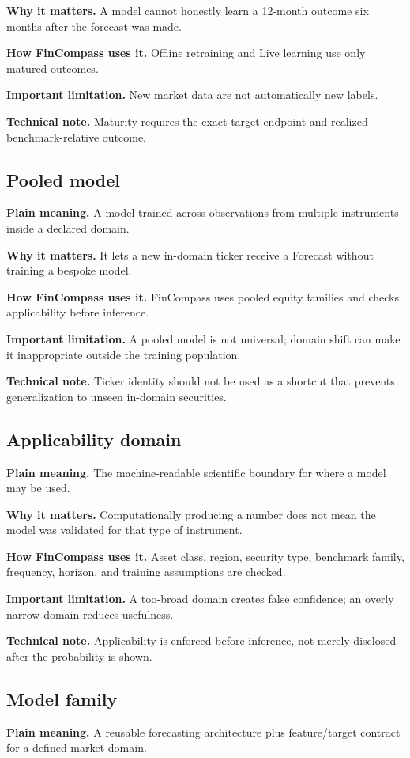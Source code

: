 \documentclass[11pt]{article}
\begin{document}
\textbf{Why it matters.} A model cannot honestly learn a 12-month outcome six months after the forecast was made.

\textbf{How FinCompass uses it.} Offline retraining and Live learning use only matured outcomes.

\textbf{Important limitation.} New market data are not automatically new labels.

\textbf{Technical note.} Maturity requires the exact target endpoint and realized benchmark-relative outcome.

\subsection{Pooled model}
\textbf{Plain meaning.} A model trained across observations from multiple instruments inside a declared domain.

\textbf{Why it matters.} It lets a new in-domain ticker receive a Forecast without training a bespoke model.

\textbf{How FinCompass uses it.} FinCompass uses pooled equity families and checks applicability before inference.

\textbf{Important limitation.} A pooled model is not universal; domain shift can make it inappropriate outside the training population.

\textbf{Technical note.} Ticker identity should not be used as a shortcut that prevents generalization to unseen in-domain securities.

\subsection{Applicability domain}
\textbf{Plain meaning.} The machine-readable scientific boundary for where a model may be used.

\textbf{Why it matters.} Computationally producing a number does not mean the model was validated for that type of instrument.

\textbf{How FinCompass uses it.} Asset class, region, security type, benchmark family, frequency, horizon, and training assumptions are checked.

\textbf{Important limitation.} A too-broad domain creates false confidence; an overly narrow domain reduces usefulness.

\textbf{Technical note.} Applicability is enforced before inference, not merely disclosed after the probability is shown.

\subsection{Model family}
\textbf{Plain meaning.} A reusable forecasting architecture plus feature/target contract for a defined market domain.
\end{document}
